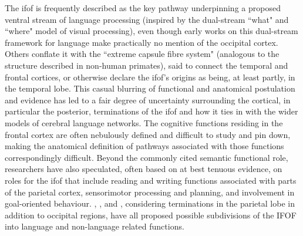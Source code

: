 The \gls{ifof} is frequently described as the key pathway underpinning a proposed ventral stream of language processing\autocite{Duffau2013a,Rollans2018,Voets2017,DavidPoeppel2012} (inspired by the dual-stream ``what" and ``where" model of visual processing), even though early works on this dual-stream framework for language make practically no mention of the occipital cortex.\autocite{Hickok2004,DavidPoeppel2012,Kummerer2013}
Others conflate it with the ``extreme capsule fibre system"\autocite{Friederici2013a,Zhang2018} (analogous to the structure described in non-human primates\autocite{Mandonnet2018,ThiebautdeSchotten2012}), said to connect the temporal and frontal cortices,\autocite{Kummerer2013}
or otherwise declare the \gls{ifof}'s origins as being, at least partly, in the temporal lobe.\autocite{Bajada2015a}
This casual blurring of functional and anatomical postulation and evidence has led to a fair degree of uncertainty surrounding the cortical, in particular the posterior,\autocite{Martino2010,Forkel2014a,Weiller2021} terminations of the \gls{ifof} and how it ties in with the wider models of cerebral language networks.
\autocite{Duffau2013a, Mandonnet2018, Rollans2018, Friederici2013a}
The cognitive functions residing in the frontal cortex are often nebulously defined and difficult to study and pin down, making the anatomical definition of pathways associated with those functions correspondingly difficult.
Beyond the commonly cited semantic functional role, researchers have also speculated, often based on at best tenuous evidence, on roles for the \gls{ifof} that include reading and writing functions associated with parts of the parietal cortex,\autocite{Motomura2014} sensorimotor processing\autocite{Martino2010} and planning,\autocite{Sarubbo2013} and involvement in goal-oriented behaviour.\autocite{Conner2018}
\textcite{Sarubbo2013}, \textcite{Martino2010}, and \textcite{Rollans2018}, considering terminations in the parietal lobe in addition to occipital regions, have all proposed possible subdivisions of the IFOF into language and non-language related functions.

